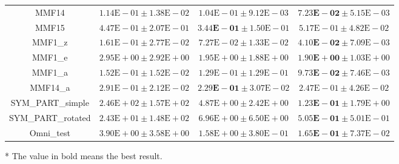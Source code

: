 \begin{table}[htbp]
\begin{tabular}{cccc}
		MMF14 & $1.14\text{E}-01 \pm 1.38\text{E}-02$ & $1.04\text{E}-01 \pm 9.12\text{E}-03$ & $\mathbf{7.23\text{E}-02} \pm 5.15\text{E}-03$\\
		MMF15 & $4.47\text{E}-01 \pm 2.07\text{E}-01$ & $\mathbf{3.44\text{E}-01} \pm 1.50\text{E}-01$ & $5.17\text{E}-01 \pm 4.82\text{E}-02$\\
		MMF1\_z & $1.61\text{E}-01 \pm 2.77\text{E}-02$ & $7.27\text{E}-02 \pm 1.33\text{E}-02$ & $\mathbf{4.10\text{E}-02} \pm 7.09\text{E}-03$\\
		MMF1\_e & $2.95\text{E}+00 \pm 2.92\text{E}+00$ & $1.95\text{E}+00 \pm 1.88\text{E}+00$ & $\mathbf{1.90\text{E}+00} \pm 1.03\text{E}+00$\\
		MMF1\_a & $1.52\text{E}-01 \pm 1.52\text{E}-02$ & $1.29\text{E}-01 \pm 1.29\text{E}-01$ & $\mathbf{9.73\text{E}-02} \pm 7.46\text{E}-03$\\
		MMF14\_a & $2.91\text{E}-01 \pm 2.12\text{E}-02$ & $\mathbf{2.29\text{E}-01} \pm 3.07\text{E}-02$ & $2.47\text{E}-01 \pm 4.26\text{E}-02$\\
		SYM\_PART\_simple & $2.46\text{E}+02 \pm 1.57\text{E}+02$ & $4.87\text{E}+00 \pm 2.42\text{E}+00$ & $\mathbf{1.23\text{E}-01} \pm 1.79\text{E}+00$\\
		SYM\_PART\_rotated & $2.43\text{E}+01 \pm 1.48\text{E}+02$ & $6.96\text{E}+00 \pm 6.50\text{E}+00$ & $\mathbf{5.05\text{E}-01} \pm 5.01\text{E}-01$\\
		Omni\_test & $3.90\text{E}+00 \pm 3.58\text{E}+00$ & $1.58\text{E}+00 \pm 3.80\text{E}-01$ & $\mathbf{1.65\text{E}-01} \pm 7.37\text{E}-02$\\
		\bottomrule
	\end{tabular}
	\begin{tablenotes}
		\item[*] The value in bold means the best result.
	\end{tablenotes}
\end{table}
\renewcommand\arraystretch{0.9}
